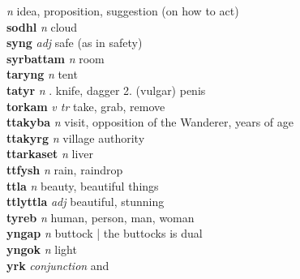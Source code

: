   \emph{n} \textperiodcentered idea, proposition, suggestion (on how to act)\\\textbf{sodhl}   \emph{n} \textperiodcentered cloud\\\textbf{syng}   \emph{adj} \textperiodcentered safe (as in safety)\\\textbf{syrbattam}   \emph{n} \textperiodcentered room\\\textbf{taryng}   \emph{n} \textperiodcentered tent\\\textbf{tatyr}   \emph{n} . knife, dagger 2. (vulgar) penis \\\textbf{torkam}   \emph{v tr} \textperiodcentered take, grab, remove\\\textbf{ttakyba}   \emph{n} \textperiodcentered visit, opposition of the Wanderer, years of age\\\textbf{ttakyrg}   \emph{n} \textperiodcentered village authority\\\textbf{ttarkaset}   \emph{n} \textperiodcentered liver\\\textbf{ttfysh}   \emph{n} \textperiodcentered rain, raindrop\\\textbf{ttla}   \emph{n} \textperiodcentered beauty, beautiful things\\\textbf{ttlyttla}   \emph{adj} \textperiodcentered beautiful, stunning\\\textbf{tyreb}   \emph{n} \textperiodcentered human, person, man, woman\\\textbf{yngap}   \emph{n} \textperiodcentered buttock | the buttocks is dual\\\textbf{yngok}   \emph{n} \textperiodcentered light\\\textbf{yrk}   \emph{conjunction} \textperiodcentered and\\